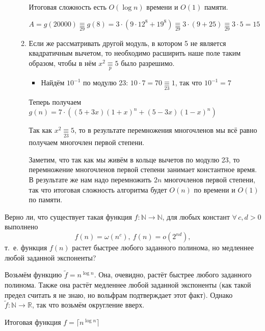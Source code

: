 \documentclass[a4paper,12pt]{article}
\begin{document}
\begin{solution}
\begin{enumerate}
\begin{enumerate}
	Итоговая сложность есть $O(\log n)$ времени и $O(1)$ памяти.
	
	$A = g(20000) \underset{29}{\equiv} g(8) = 3\cdot(9\cdot 12^8 + 19^8) \underset{29}{\equiv} 3\cdot (9 + 25) \underset{29}{\equiv} 3 \cdot 5 = 15$
	
	\item Если же рассматривать другой модуль, в котором 5 не является квадратичным вычетом, то необходимо расширить наше поле таким образом, чтобы в нём $x^2 \underset{p}{\equiv} 5$ было разрешимо. 
	
	\begin{itemize}
		\item Найдём $10^{-1}$ по модулю 23: $10 \cdot 7 = 70 \underset{23}{\equiv} 1$, так что $10^{-1} = 7$
	\end{itemize}
	
	Теперь получаем $g(n) = 7 \cdot \left((5+3x)(1+x)^n+(5-3x)(1-x)^n\right)$
	
	Так как $x^2 \underset{23}{\equiv} 5$, то в результате перемножения многочленов мы всё равно получаем многочлен первой степени.
	
	Заметим, что так как мы живём в кольце вычетов по модулю 23, то перемножение многочленов первой степени занимает константное время. В результате же нам надо перемножить $2n$ многочленов первой степени, так что итоговая сложность алгоритма будет $O(n)$ по времени и $O(1)$ по памяти.
	
	\end{enumerate}	
	\end{enumerate}
	
\end{solution}

\begin{task}
	 Верно ли, что существует такая функция $f: \mathbb{N} \rightarrow  \mathbb{N}$, для любых констант $\forall\, c,d> 0$ выполнено $$f(n) = \omega(n^c),\ f(n) = o(2^{nd}),$$ т.~е. функция $f(n)$ растет быстрее любого заданного полинома, но медленнее любой заданной экспоненты?
\end{task}

\begin{solution}
		\item Возьмём функцию $\tilde{f} = n^{\log n}$. Она, очевидно, растёт быстрее  любого заданного полинома. Также она растёт медленнее любой заданной экспоненты (как такой предел считать я не знаю, но вольфрам подтверждает этот факт). Однако $\tilde{f}: \mathbb{N} \rightarrow  \mathbb{R}$, так что возьмём округление вверх.
		
		Итоговая функция $f = \lceil n^{\log n} \rceil$
\end{solution}
\end{document}

